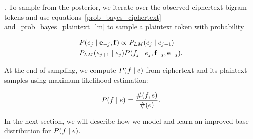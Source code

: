 . To sample from the posterior, we iterate over the observed ciphertext bigram tokens and use equations~\ref{prob_bayes_ciphertext} and~\ref{prob_bayes_plaintext_lm} to sample a plaintext token with probability

\begin{align} \label{prob_sampling_plaintext}
&P( e_j \mid \mathbf{e}_{-j}, \mathbf{f} ) \propto  P_{LM}(e_j \mid e_{j-1})  \\
&           P_{LM}(e_{j+1} \mid e_{j})   P(f_j \mid e_j,\mathbf{f}_{-j}, \mathbf{e}_{-j}).
\end{align}

\iffalse
%
\[
\label{p_sample}
P_{sample}(e_{1}e_{2}) =  P(e_{1}e_{2}) \prod_{i=1}^{2}P_{CRP}(f_{i}|e_{i})
\]
%
In the above equation, the translation probability $P_{CRP}(f_{i}|e_{i})$ is modeled by the Chinese Restaurant Process(CRP) as defined in Equation \ref{p_channel}.
%
\[
\label{p_channel}
P_{CRP}(f_{i}|e_{i}) = \frac{\alpha P_0(f_{i}|e_{i})+count(f_{i},e_{i})}{\alpha+count(e_{i})}
\]
%
where $P_{0}$ is a base distribution, also known as a prior, and $\alpha$ is a parameter that controls how much we trust the base distribution. $count(f_{i},e_{i})$ and $count(e_{i})$ record the number of times $f_{i},e_{i}$ and $e_{i}$ appear in previously generated samples respectively. The base distribution is given independently, and in all the previous work, it is set to uniform.
\fi

At the end of sampling, we compute $P(f \mid e)$ from ciphertext and its plaintext samples using maximum likelihood estimation:

\[
\label{mlh_estimation}
P(f \mid e) =  \frac{\#(f,e)}{\#(e)}.
\]

In the next section, we will describe how we model and learn an improved base distribution for $P(f \mid e)$.